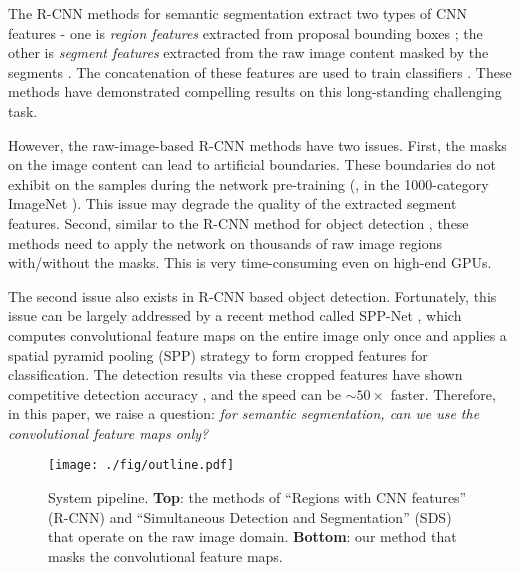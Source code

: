 \documentclass[10pt,twocolumn,letterpaper]{article}
\begin{document}
The R-CNN methods \cite{girshick2013rich,hariharan2014simultaneous} for semantic segmentation extract two types of CNN features - one is \emph{region features} \cite{girshick2013rich} extracted from proposal bounding boxes \cite{uijlings2013selective}; the other is \emph{segment features} extracted from the raw image content masked by the segments \cite{hariharan2014simultaneous}.
The concatenation of these features are used to train classifiers \cite{hariharan2014simultaneous}. These methods have demonstrated compelling results on this long-standing challenging task.

However, the raw-image-based R-CNN methods \cite{girshick2013rich,hariharan2014simultaneous} have two issues. First, the masks on the image content can lead to artificial boundaries. These boundaries do not exhibit on the samples during the network pre-training (\eg, in the 1000-category ImageNet \cite{deng2009imagenet}). This issue may degrade the quality of the extracted segment features. Second, similar to the R-CNN method for object detection \cite{girshick2013rich}, these methods need to apply the network on thousands of raw image regions with/without the masks. This is very time-consuming even on high-end GPUs.

The second issue also exists in R-CNN based object detection. Fortunately, this issue can be largely addressed by a recent method called SPP-Net \cite{he2014spatial}, which computes convolutional feature maps on the entire image only once and applies a spatial pyramid pooling (SPP) strategy to form cropped features for classification. The detection results via these cropped features have shown competitive detection accuracy \cite{he2014spatial}, and the speed can be $\sim$$50\times$ faster. Therefore, in this paper, we raise a question: \emph{for semantic segmentation, can we use the convolutional feature maps only?}

\begin{figure*}
  \centering
    \texttt{[image: ./fig/outline.pdf]}\\
\caption{System pipeline. \textbf{Top}: the methods of ``Regions with CNN features'' (R-CNN) \cite{girshick2013rich} and ``Simultaneous Detection and Segmentation'' (SDS) \cite{hariharan2014simultaneous} that operate on the raw image domain. \textbf{Bottom}: our method that masks the convolutional feature maps.}
\label{fig:algorithm_outline}
\end{figure*}
\end{document}
